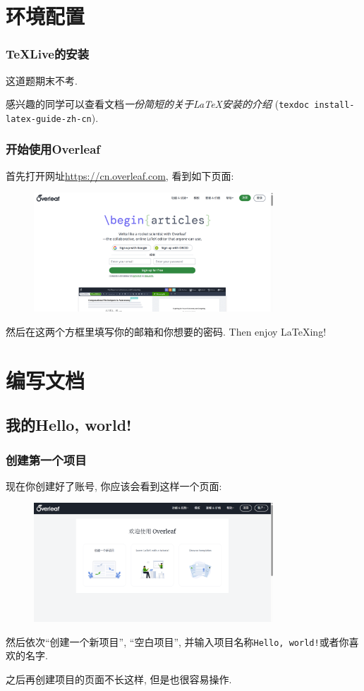 \documentclass{beamer}
\begin{document}
\section{环境配置}

\begin{frame}
    \frametitle{\TeX{}Live的安装}
    这道题期末不考.\pause

    感兴趣的同学可以查看文档\emph{一份简短的关于\LaTeX{}安装的介绍} (\Verb|texdoc install-latex-guide-zh-cn|).
\end{frame}

\begin{frame}
    \frametitle{开始使用Overleaf}
    首先打开网址\url{https://cn.overleaf.com}, 看到如下页面:
    \begin{figure}[h]
        \centering
        \includegraphics[width=0.8\textwidth]{figure/overleaf-signin.png}
    \end{figure}\pause
    然后在这两个方框里填写你的邮箱和你想要的密码.
    Then enjoy \LaTeX{ing}!
\end{frame}

\section{编写文档}

\subsection{我的Hello, world!}

\begin{frame}
    \frametitle{创建第一个项目}
    现在你创建好了账号, 你应该会看到这样一个页面:
    \begin{figure}[h]
        \centering
        \includegraphics[width=0.8\textwidth]{figure/overleaf-startproject.png}
    \end{figure}\pause
    然后依次``创建一个新项目'', ``空白项目'', 并输入项目名称\Verb|Hello, world!|或者你喜欢的名字.\pause

    之后再创建项目的页面不长这样, 但是也很容易操作.
\end{frame}
\end{document}
